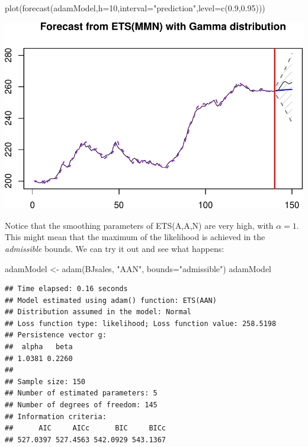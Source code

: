 \documentclass[
]{book}
\newenvironment{Shaded}{\begin{snugshade}}{\end{snugshade}}
\newcommand{\AttributeTok}[1]{\textcolor[rgb]{0.77,0.63,0.00}{#1}}
\newcommand{\DecValTok}[1]{\textcolor[rgb]{0.00,0.00,0.81}{#1}}
\newcommand{\FloatTok}[1]{\textcolor[rgb]{0.00,0.00,0.81}{#1}}
\newcommand{\FunctionTok}[1]{\textcolor[rgb]{0.00,0.00,0.00}{#1}}
\newcommand{\NormalTok}[1]{#1}
\newcommand{\OtherTok}[1]{\textcolor[rgb]{0.56,0.35,0.01}{#1}}
\newcommand{\StringTok}[1]{\textcolor[rgb]{0.31,0.60,0.02}{#1}}
\theoremstyle{definition}
\theoremstyle{definition}
\theoremstyle{definition}
\theoremstyle{definition}
\theoremstyle{remark}
\begin{document}
\begin{Shaded}
\begin{Highlighting}[]
\FunctionTok{plot}\NormalTok{(}\FunctionTok{forecast}\NormalTok{(adamModel,}\AttributeTok{h=}\DecValTok{10}\NormalTok{,}\AttributeTok{interval=}\StringTok{"prediction"}\NormalTok{,}\AttributeTok{level=}\FunctionTok{c}\NormalTok{(}\FloatTok{0.9}\NormalTok{,}\FloatTok{0.95}\NormalTok{)))}
\end{Highlighting}
\end{Shaded}

\includegraphics{adam_files/figure-latex/unnamed-chunk-33-1.pdf}

Notice that the smoothing parameters of ETS(A,A,N) are very high, with \(\alpha=1\). This might mean that the maximum of the likelihood is achieved in the \emph{admissible} bounds. We can try it out and see what happens:

\begin{Shaded}
\begin{Highlighting}[]
\NormalTok{adamModel }\OtherTok{\textless{}{-}} \FunctionTok{adam}\NormalTok{(BJsales, }\StringTok{"AAN"}\NormalTok{, }\AttributeTok{bounds=}\StringTok{"admissible"}\NormalTok{)}
\NormalTok{adamModel}
\end{Highlighting}
\end{Shaded}

\begin{verbatim}
## Time elapsed: 0.16 seconds
## Model estimated using adam() function: ETS(AAN)
## Distribution assumed in the model: Normal
## Loss function type: likelihood; Loss function value: 258.5198
## Persistence vector g:
##  alpha   beta 
## 1.0381 0.2260 
## 
## Sample size: 150
## Number of estimated parameters: 5
## Number of degrees of freedom: 145
## Information criteria:
##      AIC     AICc      BIC     BICc 
## 527.0397 527.4563 542.0929 543.1367
\end{verbatim}
\end{document}
